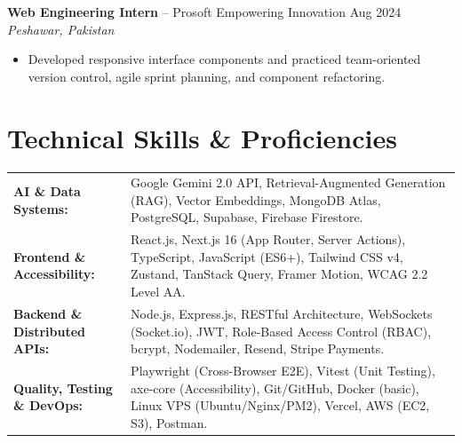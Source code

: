 \documentclass[10pt,a4paper]{article}
\begin{document}
\vspace{4pt}
\textbf{Web Engineering Intern} -- Prosoft Empowering Innovation \hfill Aug 2024 \\
\textit{Peshawar, Pakistan}
\begin{itemize}
    \item Developed responsive interface components and practiced team-oriented version control, agile sprint planning, and component refactoring.
\end{itemize}

\section{Technical Skills \& Proficiencies}
\begin{tabularx}{\textwidth}{@{}l X@{}}
    \textbf{AI \& Data Systems:} & Google Gemini 2.0 API, Retrieval-Augmented Generation (RAG), Vector Embeddings, MongoDB Atlas, PostgreSQL, Supabase, Firebase Firestore. \\
    \textbf{Frontend \& Accessibility:} & React.js, Next.js 16 (App Router, Server Actions), TypeScript, JavaScript (ES6+), Tailwind CSS v4, Zustand, TanStack Query, Framer Motion, WCAG 2.2 Level AA. \\
    \textbf{Backend \& Distributed APIs:} & Node.js, Express.js, RESTful Architecture, WebSockets (Socket.io), JWT, Role-Based Access Control (RBAC), bcrypt, Nodemailer, Resend, Stripe Payments. \\
    \textbf{Quality, Testing \& DevOps:} & Playwright (Cross-Browser E2E), Vitest (Unit Testing), axe-core (Accessibility), Git/GitHub, Docker (basic), Linux VPS (Ubuntu/Nginx/PM2), Vercel, AWS (EC2, S3), Postman.
\end{tabularx}

\end{document}
